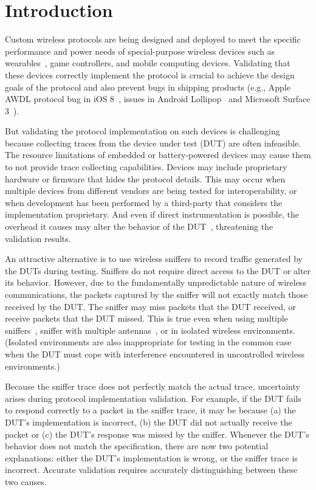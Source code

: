 
\section{Introduction}
\label{sec:intro}

Custom wireless protocols are being designed and deployed to meet the specific
performance and power needs of special-purpose wireless devices such as
wearables~\cite{iris}, game controllers, and mobile computing devices.
%
Validating that these devices correctly implement the protocol is crucial to
achieve the design goals of the protocol and also prevent bugs in shipping
products (e.g., Apple AWDL protocol bug in iOS 8~\cite{wifried}, \wifi{} issues
in Android Lollipop~\cite{lollipop} and Microsoft Surface 3~\cite{surface}).


But validating the protocol implementation on such devices is challenging
because collecting traces from the device under test (DUT) are often
infeasible.
%
The resource limitations of embedded or battery-powered devices may cause them
to not provide trace collecting capabilities.
%
Devices may include proprietary hardware or firmware that hides the protocol
details.
%
This may occur when multiple devices from different vendors are being tested
for interoperability, or when development has been performed by a third-party
that considers the implementation proprietary.
%
And even if direct instrumentation is possible, the overhead it causes may alter
the behavior of the DUT~\cite{mytkowicz2008observer}, threatening the validation
results.

An attractive alternative is to use wireless
sniffers to record traffic generated by the DUTs during testing.
%
Sniffers do not require direct access to the DUT or alter its behavior.
%
However, due to the fundamentally unpredictable nature of wireless
communications, the packets captured by the sniffer will not exactly match
those received by the DUT.
%
The sniffer may miss packets that the DUT received, or receive packets that
the DUT missed.
%
This is true even when using multiple
sniffers~\cite{Cheng:2006:JSP:1159913.1159920,
Mahajan:2006:AMB:1159913.1159923,bahl2006enhancing}, sniffer with multiple
antennas~\cite{omnipeek}, or in isolated wireless environments.
%
(Isolated environments are also inappropriate for testing in the common case
when the DUT must cope with interference encountered in uncontrolled wireless
environments.)

Because the sniffer trace does not perfectly match the actual trace,
uncertainty arises during protocol implementation validation.
%
For example, if the DUT fails to respond correctly to a packet in the sniffer
trace, it may be because (a) the DUT's implementation is incorrect, (b) the DUT
did not actually receive the packet or (c) the DUT's response was missed by the
sniffer.
%
Whenever the DUT's behavior does not match the specification, there are now two
potential explanations:
%
either the DUT's implementation is wrong, or the sniffer trace is incorrect.
%
Accurate validation requires accurately distinguishing between these two
causes.

